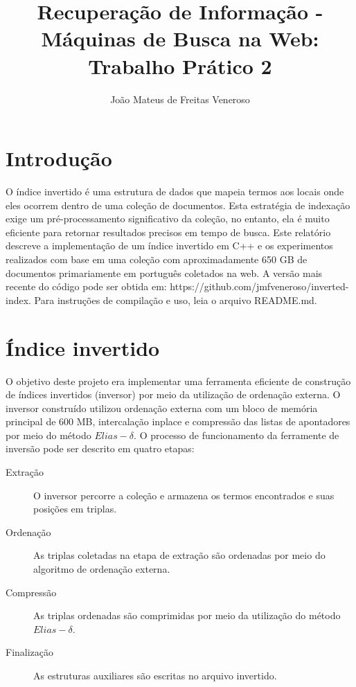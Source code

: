 \documentclass{report}
\begin{document}
\title{Recuperação de Informação - Máquinas de Busca na Web: Trabalho Prático 2}
\author{João Mateus de Freitas Veneroso}

\maketitle

\tableofcontents

\chapter{Introdução}

O índice invertido é uma estrutura de dados que mapeia termos aos locais onde eles ocorrem
dentro de uma coleção de documentos. Esta estratégia de indexação exige um pré-processamento
significativo da coleção, no entanto, ela é muito eficiente para retornar resultados precisos
em tempo de busca. Este relatório descreve a implementação de um índice invertido em C++ e
os experimentos realizados com base em uma coleção com aproximadamente 650 GB de documentos
primariamente em português coletados na web. A versão mais recente do código pode ser obtida
em: https://github.com/jmfveneroso/inverted-index. Para instruções de compilação e uso, leia
o arquivo README.md.

\chapter{Índice invertido}
O objetivo deste projeto era implementar uma ferramenta eficiente de construção de índices 
invertidos (inversor) por meio da utilização de ordenação externa. O inversor construído
utilizou ordenação externa com um bloco de memória principal de 600 MB, intercalação
inplace e compressão das listas de apontadores por meio do método $ Elias-\delta $. O processo
de funcionamento da ferramente de inversão pode ser descrito em quatro etapas:

\begin{description}
  \item [Extração]    O inversor percorre a coleção e armazena os termos encontrados e suas posições em triplas.
  \item [Ordenação]   As triplas coletadas na etapa de extração são ordenadas por meio do algoritmo de ordenação externa.
  \item [Compressão]  As triplas ordenadas são comprimidas por meio da utilização do método $ Elias-\delta $.
  \item [Finalização] As estruturas auxiliares são escritas no arquivo invertido.
\end{description}
\end{document}
